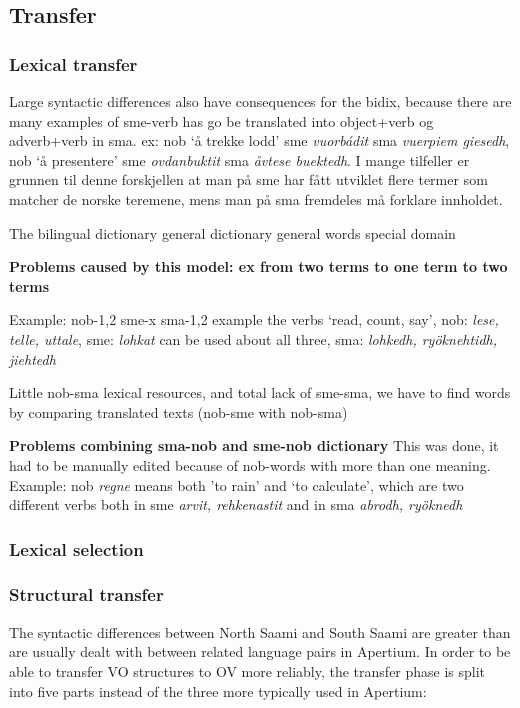 \documentclass[a4paper,11pt,twocolumn]{article}
\begin{document}
\subsection{Transfer}

\subsubsection{Lexical transfer}

Large syntactic differences also have consequences for the bidix, because there are many examples of sme-verb has go be translated into object+verb og adverb+verb in sma.
ex: nob `å trekke lodd' sme \textit{vuorbádit} sma \textit{vuerpiem giesedh}, 
nob `å presentere' sme \textit{ovdanbuktit} sma \textit{åvtese buektedh}. 
I mange tilfeller er grunnen til denne  forskjellen at man på sme har fått utviklet flere termer som matcher de norske teremene, mens man på sma
fremdeles må forklare innholdet.



The bilingual dictionary
general dictionary
general words
special domain

\textbf{Problems caused by this model: ex from two terms to one term to two terms}

Example: nob-1,2   sme-x   sma-1,2
example the verbs ‘read, count, say’, nob: \textit{lese, telle, uttale}, sme: \textit{lohkat} can be used about all three, sma: \textit{lohkedh, ryöknehtidh, jiehtedh} 

Little nob-sma lexical resources, and total lack of sme-sma, we have to find words by comparing translated texts (nob-sme with nob-sma)

\textbf{Problems combining sma-nob and sme-nob dictionary}
This was done, it had to be manually edited because of nob-words with more than one meaning. 
Example: nob \textit{regne} means both 'to rain' and ‘to calculate’, 
which are two different verbs both in sme \textit{arvit, rehkenastit} and in sma \textit{abrodh, ryöknedh}

\subsubsection{Lexical selection}

\subsubsection{Structural transfer}

The syntactic differences between North Saami and South Saami are
greater than are usually dealt with between related language pairs
in Apertium. 
In order to be able to transfer VO structures to OV more reliably,
the transfer phase is split into five parts instead of the three
more typically used in Apertium:
\end{document}
